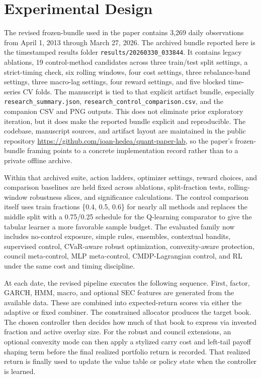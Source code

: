 \documentclass[11pt]{article}
\begin{document}
\section{Experimental Design}

The revised frozen-bundle used in the paper contains 3{,}269 daily observations
from April 1, 2013 through March 27, 2026. The archived bundle reported here is
the timestamped results folder \texttt{results/20260330\_033844}. It contains
legacy ablations, 19 control-method candidates across three train/test split
settings, a strict-timing check, six rolling windows, four cost settings,
three rebalance-band settings, three macro-lag settings, four reward settings,
and five blocked time-series CV folds. The manuscript is tied to that explicit
artifact bundle, especially \texttt{research\_summary.json},
\texttt{research\_control\_comparison.csv}, and the companion CSV and PNG
outputs. This does not eliminate prior exploratory iteration, but it does make
the reported bundle explicit and reproducible.
The codebase, manuscript sources, and artifact layout are maintained in the
public repository \url{https://github.com/ioan-hedea/quant-paper-lab}, so the
paper's frozen-bundle framing points to a concrete implementation record rather
than to a private offline archive.

Within that archived suite, action ladders, optimizer settings, reward choices,
and comparison baselines are held fixed across ablations, split-fraction tests,
rolling-window robustness slices, and significance calculations. The control
comparison itself uses train fractions \{0.4, 0.5, 0.6\} for nearly all methods
and replaces the middle split with a 0.75/0.25 schedule for the Q-learning
comparator to give the tabular learner a more favorable sample budget. The
evaluated family now includes no-control exposure, simple rules, ensembles,
contextual bandits, supervised control, CVaR-aware robust optimization,
convexity-aware protection, council meta-control, MLP meta-control,
CMDP-Lagrangian control, and RL under the same cost and timing discipline.

At each date, the revised pipeline executes the following sequence. First,
factor, GARCH, HMM, macro, and optional SEC features are generated from the
available data. These are combined into expected-return scores via either the
adaptive or fixed combiner. The constrained allocator produces the target book.
The chosen controller then decides how much of that book to express via
invested fraction and active overlay size. For the robust and council
extensions, an optional convexity mode can then apply a stylized carry cost and
left-tail payoff shaping term before the final realized portfolio return is
recorded. That realized return is finally used to update the value table or
policy state when the controller is learned.
\end{document}
